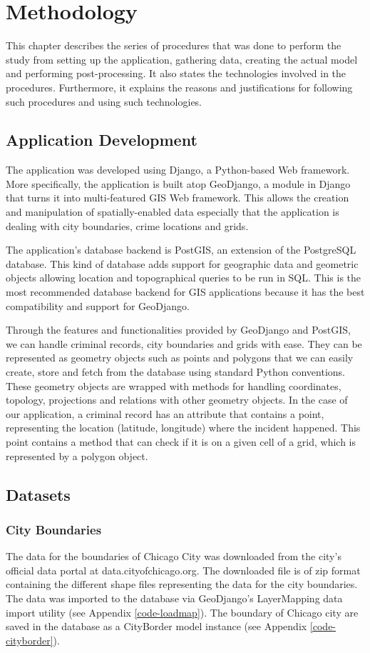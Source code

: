 \chapter{Methodology}
    This chapter describes the series of procedures that was done to perform the study \textemdash from setting up the application, gathering data, creating the actual model and performing post-processing. It also states the technologies involved in the procedures. Furthermore, it explains the reasons and justifications for following such procedures and using such technologies.
\section{Application Development}
    The application was developed using Django, a Python-based Web framework. More specifically, the application is built atop GeoDjango, a module in Django that turns it into multi-featured GIS Web framework. This allows the creation and manipulation of spatially-enabled data especially that the application is dealing with city boundaries, crime locations and grids.

    The application's database backend is PostGIS, an extension of the PostgreSQL database. This kind of database adds support for geographic data and geometric objects allowing location and topographical queries to be run in SQL. This is the most recommended database backend for GIS applications because it has the best compatibility and support for GeoDjango.

    Through the features and functionalities provided by GeoDjango and PostGIS, we can handle criminal records, city boundaries and grids with ease. They can be represented as geometry objects such as points and polygons that we can easily create, store and fetch from the database using standard Python conventions. These geometry objects are wrapped with methods for handling coordinates, topology, projections and relations with other geometry objects. In the case of our application, a criminal record has an attribute that contains a point, representing the location (latitude, longitude) where the incident happened. This point contains a method that can check if it is on a given cell of a grid, which is represented by a polygon object.

\section{Datasets}
    \subsection{City Boundaries}
        The data for the boundaries of Chicago City was downloaded from the city's official data portal at data.cityofchicago.org. The downloaded file is of zip format containing the different shape files representing the data for the city boundaries. The data was imported to the database via GeoDjango's LayerMapping data import utility (see Appendix \ref{code-loadmap}). The boundary of Chicago city are saved in the database as a CityBorder model instance (see Appendix \ref{code-cityborder}). 
